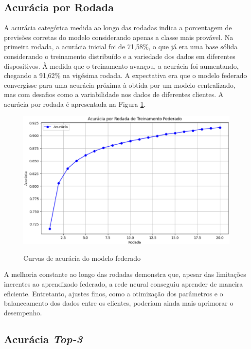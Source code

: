 \subsection{Acurácia por Rodada}

A acurácia categórica medida ao longo das rodadas indica a porcentagem de previsões corretas do modelo considerando apenas a classe mais provável. Na primeira rodada, a acurácia inicial foi de 71,58\%, o que já era uma base sólida considerando o treinamento distribuído e a variedade dos dados em diferentes dispositivos. À medida que o treinamento avançou, a acurácia foi aumentando, chegando a 91,62\% na vigésima rodada. A expectativa era que o modelo federado convergisse para uma acurácia próxima à obtida por um modelo centralizado, mas com desafios como a variabilidade nos dados de diferentes clientes. A acurácia por rodada é apresentada na Figura \ref{fig:acuracyFederated}.

\begin{figure}[ht]
    \centering
    \caption{Curvas de acurácia do modelo federado}
    \includegraphics[scale=0.4]{figuras/analiseResultados/acuracyFederated.eps}
    \label{fig:acuracyFederated}
\end{figure}

A melhoria constante ao longo das rodadas demonstra que, apesar das limitações inerentes ao aprendizado federado, a rede neural conseguiu aprender de maneira eficiente. Entretanto, ajustes finos, como a otimização dos parâmetros e o balanceamento dos dados entre os clientes, poderiam ainda mais aprimorar o desempenho.

\subsection{Acurácia \textit{Top-3}}


